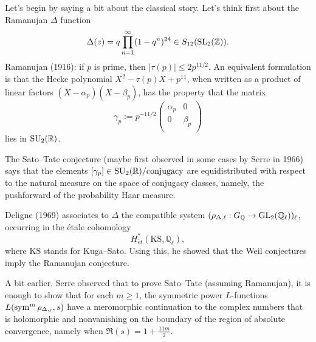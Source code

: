 \documentclass[reqno]{amsart} 
\begin{document}
Let's begin by saying a bit about the classical story.  Let's think first about the Ramanujan $\Delta$ function
\begin{equation*}
  \Delta(z) = q \prod_{n = 1}^\infty(1 - q^n)^{2 4} \in S_{12}(\operatorname{SL}_2(\mathbb{Z})).
\end{equation*}
Ramanujan (1916): if $p$ is prime, then $\lvert \tau(p) \rvert \leq 2 p^{11/2}$.  An equivalent formulation is that the Hecke polynomial $X^2 - \tau(p) X + p^{11}$, when written as a product of linear factors $(X - \alpha_p)( X - \beta_p)$, has the property that the matrix
\begin{equation*}
  \gamma_p := p^{- 11/2}
  \begin{pmatrix}
    \alpha_p    & 0 \\
    0 & \beta_p  \\
  \end{pmatrix}
\end{equation*}
lies in $\operatorname{SU}_2(\mathbb{R})$.

The Sato--Tate conjecture (maybe first observed in some cases by Serre in 1966) says that the elements $[\gamma_p] \in \operatorname{SU}_2(\mathbb{R}) / \mathrm{conjugacy}$ are equidistributed with respect to the natural measure on the space of conjugacy classes, namely, the pushforward of the probability Haar measure.

Deligne (1969) associates to $\Delta$ the compatible system $(\rho_{\Delta, \ell} : G_{\mathbb{Q}} \rightarrow \operatorname{GL}_2(\mathbb{Q}_{\ell}))_{\ell}$, occurring in the {\'e}tale cohomology
\begin{equation*}
  H^\ast_{\acute{e}t}(\mathrm{K S}, \mathbb{Q}_{\ell}),
\end{equation*}
where $\mathrm{K S}$ stands for Kuga--Sato.  Using this, he showed that the Weil conjectures imply the Ramanujan conjecture.

A bit earlier, Serre observed that to prove Sato--Tate (assuming Ramanujan), it is enough to show that for each $m \geq 1$, the symmetric power $L$-functions $L(\operatorname{sym}^m \rho_{\Delta,_{\ell}}, s)$ have a meromorphic continuation to the complex numbers that is holomorphic and nonvanishing on the boundary of the region of absolute convergence, namely when $\Re(s) = 1 + \tfrac{11m}{2}$.
\end{document}
